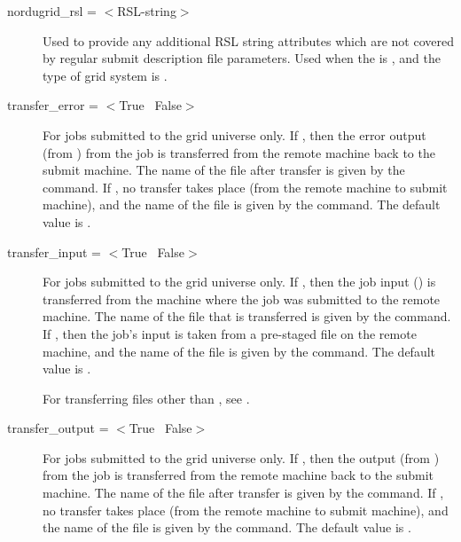 \begin{description}

\item[nordugrid\_rsl = $<$RSL-string$>$]
Used to provide any additional RSL
string attributes which are not covered by regular submit description
file parameters. Used when the  is ,
and the type of grid system is .


\item[transfer\_error = $<$True \Bar\ False$>$]
For jobs submitted to the grid universe only.
If , then the error output (from ) from the job
is transferred from the remote machine back to the submit machine.
The name of the file after transfer is given
by the  command.
If , no transfer takes place (from the remote machine
to submit machine),
and the name of the file is given
by the  command.
The default value is .

\item[transfer\_input = $<$True \Bar\ False$>$]
For jobs submitted to the grid universe only.
If , then the job input () is transferred
from the machine where the job was submitted to the remote machine.
The name of the file that is transferred is given by the
 command.
If , then the job's input is taken from a pre-staged
file on the remote machine, and
the name of the file is given by the  command.
The default value is .

For transferring files other than ,
see .

\item[transfer\_output = $<$True \Bar\ False$>$]
For jobs submitted to the grid universe only.
If , then the output (from ) from the job
is transferred from the remote machine back to the submit machine.
The name of the file after transfer is given
by the  command.
If , no transfer takes place (from the remote machine
to submit machine),
and the name of the file is given
by the  command.
The default value is .


\end{description}
